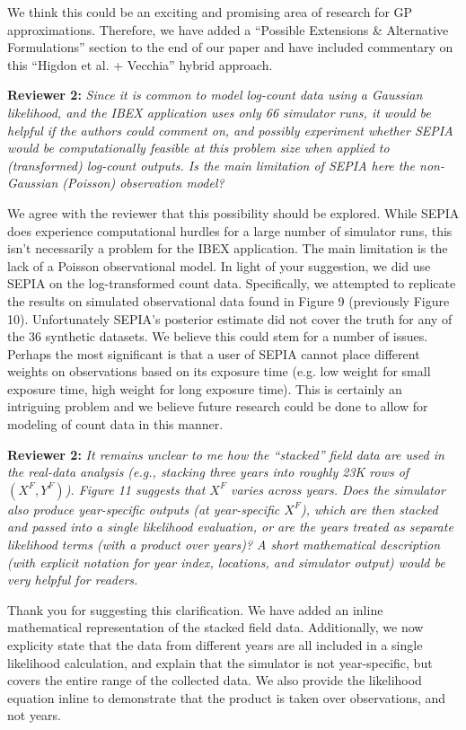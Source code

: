 \documentclass[12pt]{article}
\begin{document}
\bigskip
\noindent
We think this could be an exciting and promising area of research for GP
approximations. Therefore, we have added a ``Possible Extensions \&
Alternative Formulations'' section to the end of our paper and have included
commentary on this ``Higdon et al. + Vecchia'' hybrid approach.

\bigskip
\noindent
\textbf{Reviewer 2:} \textit{Since it is common to model log-count data using
a Gaussian likelihood, and the IBEX application uses only 66 simulator runs,
it would be helpful if the authors could comment on, and possibly experiment
whether SEPIA would be computationally feasible at this problem size when
applied to (transformed) log-count outputs. Is the main limitation of SEPIA
here the non-Gaussian (Poisson) observation model?}

\bigskip
\noindent
We agree with the reviewer that this possibility should be explored. While
SEPIA does experience computational hurdles for a large number of simulator
runs, this isn't necessarily a problem for the IBEX application. The main
limitation is the lack of a Poisson observational model. In light of your
suggestion, we did use SEPIA on the log-transformed count data. Specifically,
we attempted to replicate the results on simulated observational data found in
Figure 9 (previously Figure 10). Unfortunately SEPIA's posterior estimate did
not cover the truth for any of the 36 synthetic datasets. We believe this
could stem for a number of issues. Perhaps the most significant is that a user
of SEPIA cannot place different weights on observations based on its exposure
time (e.g. low weight for small exposure time, high weight for long exposure
time). This is certainly an intriguing problem and we believe future research
could be done to allow for modeling of count data in this manner.

\bigskip
\noindent
\textbf{Reviewer 2:} \textit{It remains unclear to me how the ``stacked'' field
data are used in the real-data analysis (e.g., stacking three years into
roughly 23K rows of \((X^F, Y^F)\)). Figure 11 suggests that \(X^F\) varies
across years. Does the simulator also produce year-specific outputs (at
year-specific \(X^F\)), which are then stacked and passed into a single
likelihood evaluation, or are the years treated as separate likelihood terms
(with a product over years)? A short mathematical description (with explicit
notation for year index, locations, and simulator output) would be very
helpful for readers.}

\bigskip
\noindent
Thank you for suggesting this clarification. We have added an inline
mathematical representation of the stacked field data. Additionally, we now
explicity state that the data from different years are all included in a
single likelihood calculation, and explain that the simulator is not
year-specific, but covers the entire range of the collected data. We also
provide the likelihood equation inline to demonstrate that the product is
taken over observations, and not years.
\end{document}
